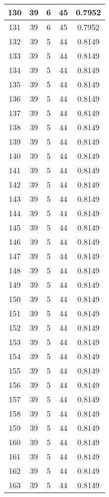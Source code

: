 \documentclass[letterpaper, 12pt]{article}
\begin{document}
\begin{longtable}{|c|c|c|c|c|}
\hline
130 & 39 & 6 & 45 & 0.7952 \\
\hline
131 & 39 & 6 & 45 & 0.7952 \\
\hline
132 & 39 & 5 & 44 & 0.8149 \\
\hline
133 & 39 & 5 & 44 & 0.8149 \\
\hline
134 & 39 & 5 & 44 & 0.8149 \\
\hline
135 & 39 & 5 & 44 & 0.8149 \\
\hline
136 & 39 & 5 & 44 & 0.8149 \\
\hline
137 & 39 & 5 & 44 & 0.8149 \\
\hline
138 & 39 & 5 & 44 & 0.8149 \\
\hline
139 & 39 & 5 & 44 & 0.8149 \\
\hline
140 & 39 & 5 & 44 & 0.8149 \\
\hline
141 & 39 & 5 & 44 & 0.8149 \\
\hline
142 & 39 & 5 & 44 & 0.8149 \\
\hline
143 & 39 & 5 & 44 & 0.8149 \\
\hline
144 & 39 & 5 & 44 & 0.8149 \\
\hline
145 & 39 & 5 & 44 & 0.8149 \\
\hline
146 & 39 & 5 & 44 & 0.8149 \\
\hline
147 & 39 & 5 & 44 & 0.8149 \\
\hline
148 & 39 & 5 & 44 & 0.8149 \\
\hline
149 & 39 & 5 & 44 & 0.8149 \\
\hline
150 & 39 & 5 & 44 & 0.8149 \\
\hline
151 & 39 & 5 & 44 & 0.8149 \\
\hline
152 & 39 & 5 & 44 & 0.8149 \\
\hline
153 & 39 & 5 & 44 & 0.8149 \\
\hline
154 & 39 & 5 & 44 & 0.8149 \\
\hline
155 & 39 & 5 & 44 & 0.8149 \\
\hline
156 & 39 & 5 & 44 & 0.8149 \\
\hline
157 & 39 & 5 & 44 & 0.8149 \\
\hline
158 & 39 & 5 & 44 & 0.8149 \\
\hline
159 & 39 & 5 & 44 & 0.8149 \\
\hline
160 & 39 & 5 & 44 & 0.8149 \\
\hline
161 & 39 & 5 & 44 & 0.8149 \\
\hline
162 & 39 & 5 & 44 & 0.8149 \\
\hline
163 & 39 & 5 & 44 & 0.8149 \\

\end{longtable}
\end{document}
